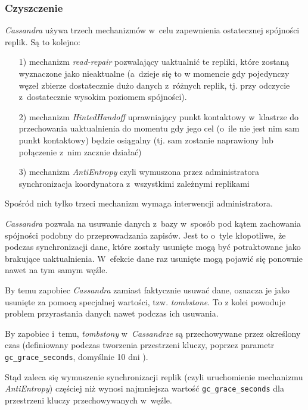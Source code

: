 \documentclass{article} %
\begin{document}
\subsubsection{Czyszczenie}\label{subsec:cluster_misc_distdeletes}

\emph{Cassandra} używa trzech mechanizmów w~celu zapewnienia ostatecznej spójności replik.
Są to kolejno:

\begin{enumerate}
\item[1)] mechanizm \emph{read-repair} pozwalający uaktualnić te repliki, które zostaną wyznaczone jako nieaktualne (a~dzieje się to w momencie gdy pojedynczy węzeł zbierze dostatecznie dużo danych z~różnych replik, tj. przy odczycie z~dostatecznie wysokim poziomem spójności).
\item[2)] mechanizm \emph{HintedHandoff} uprawniający punkt kontaktowy w~klastrze do przechowania uaktualnienia do momentu gdy jego cel (o~ile nie jest nim sam punkt kontaktowy) będzie osiągalny (tj. sam zostanie naprawiony lub połączenie z~nim zacznie działać)
\item[3)] mechanizm \emph{AntiEntropy} czyli wymuszona przez administratora synchronizacja koordynatora z~wszystkimi zależnymi replikami
\end{enumerate}

Spośród nich tylko trzeci mechanizm wymaga interwencji administratora.

\emph{Cassandra} pozwala na usuwanie danych z~bazy w~sposób pod kątem zachowania spójności podobny do przeprowadzania zapisów.
Jest to o~tyle kłopotliwe, że podczas synchronizacji dane, które zostały usunięte mogą być potraktowane jako brakujące uaktualnienia.
W~efekcie dane raz usunięte mogą pojawić się ponownie nawet na tym samym węźle.

By temu zapobiec \emph{Cassandra} zamiast faktycznie usuwać dane, oznacza je jako usunięte za pomocą specjalnej wartości, tzw. \emph{tombstone}.
To z kolei powoduje problem przyrastania danych nawet podczas ich usuwania.

By zapobiec i~temu, \emph{tombstony} w~\emph{Cassandrze} są przechowywane przez określony czas (definiowany podczas tworzenia przestrzeni kluczy, poprzez parametr \texttt{gc\_grace\_seconds}, domyślnie 10 dni \cite{distributeddeletes}).

Stąd zaleca się wymuszenie synchronizacji replik (czyli uruchomienie mechanizmu \emph{AntiEntropy}) częściej niż wynosi najmniejsza wartość \texttt{gc\_grace\_seconds} dla przestrzeni kluczy przechowywanych w~węźle.
\end{document}
